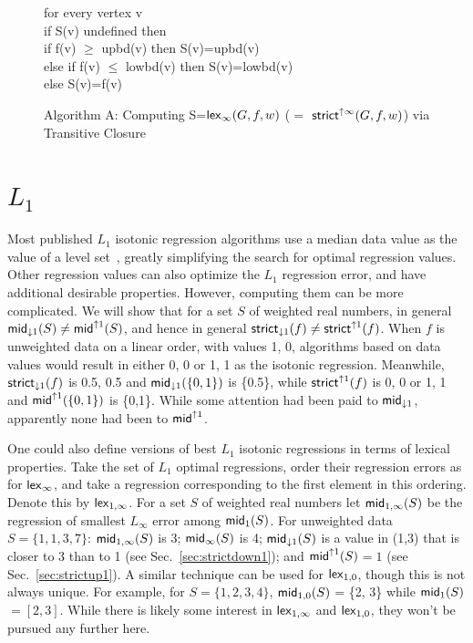 \documentclass[11pt]{article}
\newcommand{\wmean}[2]{\ensuremath{\mathsf{mid}_{#1}\ifthenelse{\equal{#2}{}}{}{(#2)}}}
\newcommand{\wmeandown}[2]{\ensuremath{\mathsf{mid}_{\downarrow #1}\ifthenelse{\equal{#2}{}}{}{(#2)}}}
\newcommand{\wmeanup}[2]{\ensuremath{\mathsf{mid}^{\uparrow #1}\ifthenelse{\equal{#2}{}}{}{(#2)}}}
\newcommand{\Strictdown}[2]{\ensuremath{\mathsf{strict}_{\downarrow{#1}}\ifthenelse{\equal{#2}{}}{}{(#2)}}}
\newcommand{\Strictup}[2]{\ensuremath{\mathsf{strict}^{\uparrow {#1}}\ifthenelse{\equal{#2}{}}{}{(#2)}}}
\newcommand{\lex}[2]{\ensuremath{\mathsf{lex}_{#1} \ifthenelse{\equal{#2}{}}{}{(#2)}}}
\newlength{\Ainlength}
\newlength{\Aintemp}
\newcommand{\Ain}[1]{\setlength{\Aintemp}{0.5in}\addtolength{\Aintemp}{#1\Ainlength} \hspace*{\Aintemp}}
\begin{document}
\begin{figure}
{\Ain{0} for every vertex v\\
\Ain{1}    if S(v) undefined then\\ 
\Ain{2}       if f(v) $\geq$ upbd(v) then S(v)=upbd(v)\\
\Ain{2}       else if f(v) $\leq$ lowbd(v) then S(v)=lowbd(v)\\
\Ain{2}       else S(v)=f(v)
}%
\bigskip \bigskip

\centerline{Algorithm A: Computing S=\lex{\infty}{G,f,w} ($=$ \Strictup{\infty}{G,f,w}) via Transitive Closure}

\end{figure}




\section{$L_1$} \label{sec:L1}


Most published $L_1$ isotonic regression algorithms use a median data value as the value of a level set~\cite{AHKS_L1,Yale_AllLp,Pardalosetal94,RobertsonWright,Rote,ShiMinL195,QPartition,QLpviaL0},
greatly simplifying the search for optimal regression values.
Other regression values can also optimize the $L_1$ regression error, and have additional desirable properties.
However, computing them can be more complicated.
We will show that for a set $S$ of weighted real numbers, in general $\wmeandown{1}{S} \neq \wmeanup{1}{S}$, and hence in general $\Strictdown{1}{f} \neq \Strictup{1}{f}$.
When $f$ is unweighted data on a linear order, with values 1, 0, algorithms based on data values would result in either 0, 0 or 1, 1 as the isotonic regression.
Meanwhile, \Strictdown{1}{f} is 0.5, 0.5 and \wmeandown{1}{\{0,1\}} is \{0.5\}, while \Strictup{1}{f} is 0, 0 or 1, 1 and \wmeanup{1}{\{0,1\}} is \{0,1\}.
While some attention had been paid to \wmeandown{1}{}, apparently none had been to \wmeanup{1}{}.

One could also define versions of best $L_1$ isotonic regressions in terms of lexical properties.
Take the set of $L_1$ optimal regressions, order their regression errors as for \lex{\infty}{}, and take a regression corresponding to the first element in this ordering.
Denote this by \lex{1,\infty}{}.
For a set $S$ of weighted real numbers let \wmean{1,\infty}{S} be the regression of smallest $L_\infty$ error among \wmean{1}{S}.
For unweighted data $S = \{1, 1, 3, 7\}$: \wmean{1,\infty}{S} is 3; \wmean{\infty}{S} is 4;  \wmeandown{1}{S} is a value in (1,3) that is closer to 3 than to 1 (see Sec.~\ref{sec:strictdown1}); and \wmeanup{1}{S}$=1$ (see Sec.~\ref{sec:strictup1}).
A similar technique can be used for \lex{1,0}{}, though this is not always unique.
For example, for $S= \{1, 2, 3, 4\}$, \wmean{1,0}{S} = \{2, 3\} while \wmean{1}{S}$=[2,3]$.
While there is likely some interest in \lex{1,\infty}{} and \lex{1,0}{}, they won't be pursued any further here.
\end{document}
